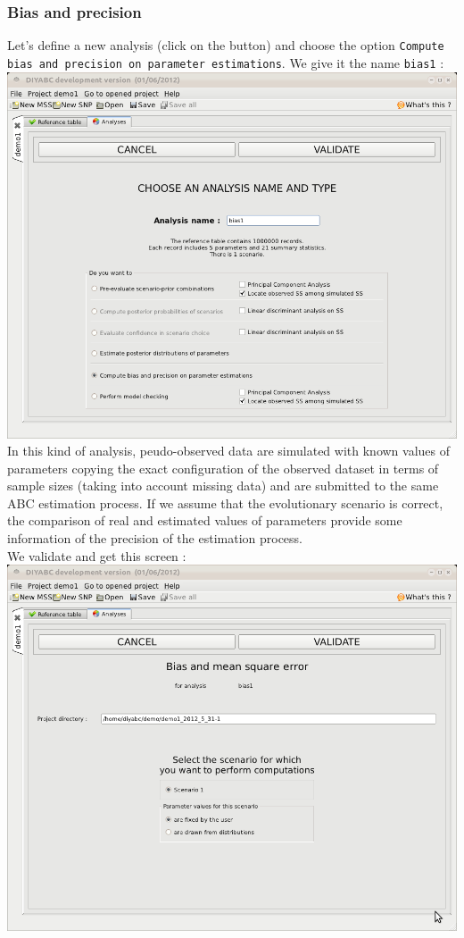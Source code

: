\subsubsection{Bias and precision}
Let's define a new analysis (click on the  button) and choose the option \texttt{Compute bias and precision on parameter estimations}. We give it the name \texttt{bias1} :\\

\includegraphics[scale=0.35]{gui_pictures/Capture-DIYABC-43.png} \\

In this kind of analysis, peudo-observed data are simulated with known values of parameters copying the exact configuration of the observed dataset in terms of sample sizes (taking into account missing data) and are submitted to the same ABC estimation process. If we assume that the evolutionary scenario is correct, the comparison of real and estimated values of parameters provide some information of the precision of the estimation process.\\  
We validate and get this screen :\\

\includegraphics[scale=0.35]{gui_pictures/Capture-DIYABC-44.png} \\

